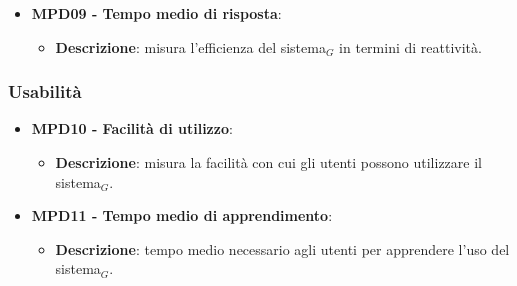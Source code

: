 \documentclass[10pt]{article}
\begin{document}
\begin{justify}
\begin{itemize}
    \item \textbf{MPD09 - Tempo medio di risposta}:
    \begin{itemize}
        \item \textbf{Descrizione}: misura l'efficienza del sistema$_G$ in termini di reattività.
    \end{itemize}
\end{itemize}

\subsubsection{Usabilità}
\begin{itemize}
    \item \textbf{MPD10 - Facilità di utilizzo}:
        \begin{itemize}
            \item \textbf{Descrizione}:  misura la facilità con cui gli utenti possono utilizzare il sistema$_G$.
        \end{itemize}
    \item \textbf{MPD11 - Tempo medio di apprendimento}:
        \begin{itemize}
            \item \textbf{Descrizione}: tempo medio necessario agli utenti per apprendere l'uso del sistema$_G$.
        \end{itemize}
\end{itemize}


\end{justify}
\end{document}
